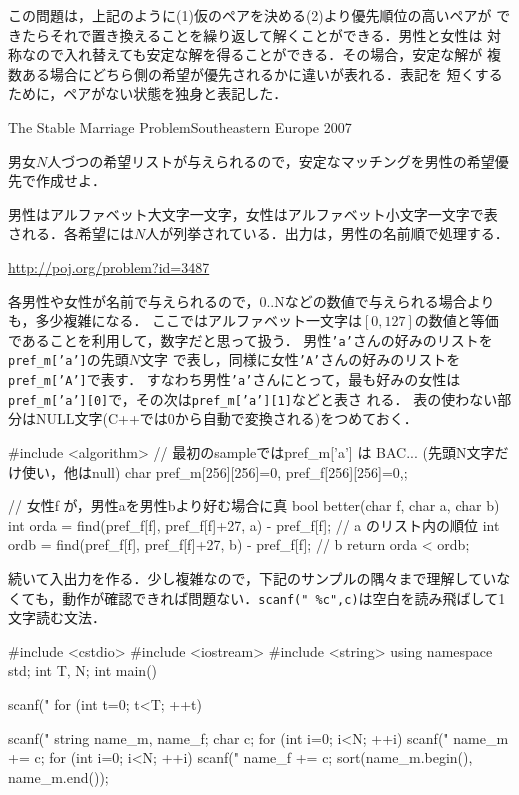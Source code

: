 \begin{versionalpha}
\medskip

この問題は，上記のように(1)仮のペアを決める(2)より優先順位の高いペアが
できたらそれで置き換えることを繰り返して解くことができる．男性と女性は
対称なので入れ替えても安定な解を得ることができる．その場合，安定な解が
複数ある場合にどちら側の希望が優先されるかに違いが表れる．表記を
短くするために，ペアがない状態を独身と表記した．


\begin{pbox}{The Stable Marriage Problem}{Southeastern Europe 2007}

男女$N$人づつの希望リストが与えられるので，安定なマッチングを男性の希望優先で作成せよ．

男性はアルファベット大文字一文字，女性はアルファベット小文字一文字で表
される．各希望には$N$人が列挙されている．出力は，男性の名前順で処理する．

\url{http://poj.org/problem?id=3487}
\end{pbox}

各男性や女性が名前で与えられるので，0..Nなどの数値で与えられる場合よりも，多少複雑になる．
ここではアルファベット一文字は$[0,127]$の数値と等価であることを利用して，数字だと思って扱う．
男性\texttt{'a'}さんの好みのリストを\texttt{pref\_m['a']}の先頭$N$文字
で表し，同様に女性\texttt{'A'}さんの好みのリストを
\texttt{pref\_m['A']}で表す．
すなわち男性\texttt{'a'}さんにとって，最も好みの女性は
\texttt{pref\_m['a'][0]}で，その次は\texttt{pref\_m['a'][1]}などと表さ
れる．
表の使わない部分はNULL文字(C++では0から自動で変換される)をつめておく．


\begin{cbox}
#include <algorithm>
// 最初のsampleではpref\_m['a'] は BAC... (先頭N文字だけ使い，他はnull)
char pref_m[256][256]={{0}}, pref_f[256][256]={{0}},;

// 女性f が，男性aを男性bより好む場合に真
bool better(char f, char a, char b) { 
  int orda = find(pref_f[f], pref_f[f]+27, a) - pref_f[f]; // a のリスト内の順位
  int ordb = find(pref_f[f], pref_f[f]+27, b) - pref_f[f]; // b
  return orda < ordb;
}
\end{cbox}

続いて入出力を作る．少し複雑なので，下記のサンプルの隅々まで理解していなくても，動作が確認できれば問題ない．\texttt{scanf(" \%c",c)}は空白を読み飛ばして1文字読む文法．


\begin{cbox}
#include <cstdio>
#include <iostream>
#include <string>
using namespace std;
int T, N;
int main() {
    scanf("
    for (int t=0; t<T; ++t) {
        scanf("
        string name_m, name_f;
        char c;
        for (int i=0; i<N; ++i) {
            scanf(" 
            name_m += c;
        }
        for (int i=0; i<N; ++i) {
            scanf(" 
            name_f += c;
        }
        sort(name_m.begin(), name_m.end());
        
}}
\end{cbox}
\end{versionalpha}
